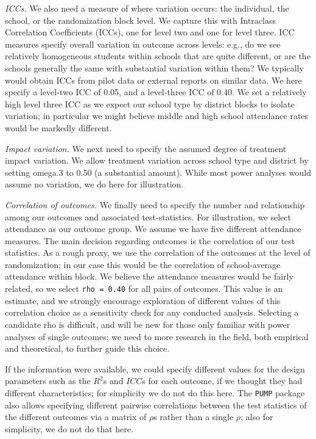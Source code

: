 \documentclass[
]{article}
\begin{document}
\emph{ICCs.} We also need a measure of where variation occurs: the
individual, the school, or the randomization block level. We capture
this with Intraclass Correlation Coefficients (ICCs), one for level two
and one for level three. ICC measures specify overall variation in
outcome across levels: e.g., do we see relatively homogeneous students
within schools that are quite different, or are the schools generally
the same with substantial variation within them? We typically would
obtain ICCs from pilot data or external reports on similar data. We here
specify a level-two ICC of 0.05, and a level-three ICC of 0.40. We set a
relatively high level three ICC as we expect our school type by district
blocks to isolate variation; in particular we might believe middle and
high school attendance rates would be markedly different.

\emph{Impact variation.} We next need to specify the assumed degree of
treatment impact variation. We allow treatment variation across school
type and district by setting omega.3 to 0.50 (a substantial amount).
While most power analyses would assume no variation, we do here for
illustration.

\emph{Correlation of outcomes.} We finally need to specify the number
and relationship among our outcomes and associated test-statistics. For
illustration, we select attendance as our outcome group. We assume we
have five different attendance measures. The main decision regarding
outcomes is the correlation of our test statistics. As a rough proxy, we
use the correlation of the outcomes at the level of randomization; in
our case this would be the correlation of school-average attendance
within block. We believe the attendance measures would be fairly
related, so we select \texttt{rho\ =\ 0.40} for all pairs of outcomes.
This value is an estimate, and we strongly encourage exploration of
different values of this correlation choice as a sensitivity check for
any conducted analysis. Selecting a candidate rho is difficult, and will
be new for those only familiar with power analyses of single outcomes;
we need to more research in the field, both empirical and theoretical,
to further guide this choice.

If the information were available, we could specify different values for
the design parameters such as the \(R^2\)s and \(ICC\)s for each
outcome, if we thought they had different characteristics; for
simplicity we do not do this here. The \texttt{PUMP} package also allows
specifying different pairwise correlations between the test statistics
of the different outcomes via a matrix of \(\rho\)s rather than a single
\(\rho\); also for simplicity, we do not do that here.
\end{document}
